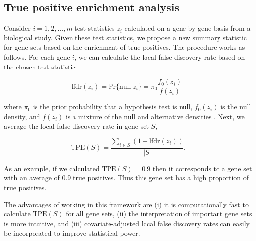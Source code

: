 \documentclass[11pt]{article}
\begin{document}
\subsection{True positive enrichment analysis\label{Subsec:tpea}}

Consider $i=1,2,...,m$ test statistics $z_{i}$ calculated on a gene-by-gene basis from a biological study. Given these test statistics, we propose a new summary statistic for gene sets based on the enrichment of true positives. The procedure works as follows. For each gene $i$, we can calculate the local false discovery rate based on the chosen test statistic:

$$
\text{lfdr}(z_{i}) = \text{Pr}\{\text{null}|z_{i}\} = \pi_{0} \dfrac{f_{0}(z_{i})}{f(z_{i})},
$$

\noindent where $\pi_{0}$ is the prior probability that a hypothesis test is null, $f_{0}(z_{i})$ is the null density, and $f(z_{i})$ is a mixture of the null and alternative densities \citep{efron2001empirical}. Next, we average the local false discovery rate in gene set $S$, 

$$
\text{TPE}(S) = \frac{\sum\limits_{i\in S} (1-\text{lfdr}(z_{i}))}{|S|}.
$$

\noindent As an example, if we calculated $\text{TPE}(S)=0.9$ then it corresponds to a gene set with an average of 0.9 true positives. Thus this gene set has a high proportion of true positives.

The advantages of working in this framework are (i) it is computationally fast to calculate $\text{TPE}(S)$ for all gene sets, (ii) the interpretation of important gene sets is more intuitive, and (iii) covariate-adjusted local false discovery rates can easily be incorporated to improve statistical power.

\clearpage


\end{document}
